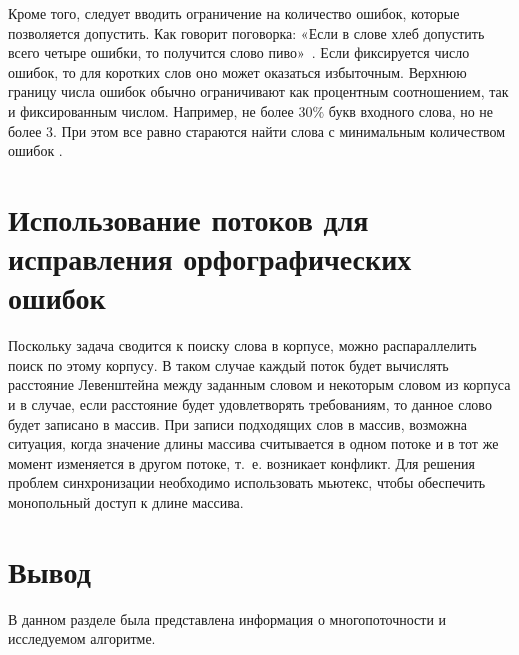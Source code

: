 Кроме того, следует вводить ограничение на количество ошибок, которые позволяется допустить. Как говорит поговорка: «Если в слове хлеб допустить всего четыре ошибки, то получится слово пиво»~\cite{miem}. 
Если фиксируется число ошибок, то для коротких слов оно может оказаться избыточным.
Верхнюю границу числа ошибок обычно ограничивают как процентным соотношением, так и фиксированным числом. 
Например, не более $30\%$ букв входного слова, но не более 3.
При этом все равно стараются найти слова с минимальным количеством ошибок \cite{miem}.

\section{Использование потоков для исправления орфографических ошибок}

Поскольку задача сводится к поиску слова в корпусе, можно распараллелить поиск по этому корпусу. В таком случае каждый поток будет вычислять расстояние Левенштейна между заданным словом и некоторым словом из корпуса и в случае, если расстояние будет удовлетворять требованиям, то данное слово будет записано в массив. При записи подходящих слов в массив, возможна ситуация, когда значение длины массива считывается в одном потоке и в тот же момент изменяется в другом потоке, т.~е. возникает конфликт. Для решения проблем синхронизации необходимо использовать мьютекс, чтобы обеспечить монопольный доступ к длине массива. 

\section*{Вывод} 
В данном разделе была представлена информация о многопоточности
и исследуемом алгоритме.